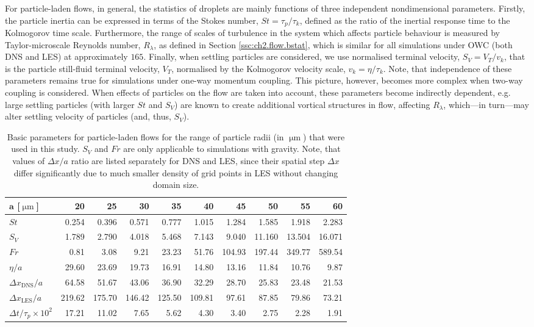 \documentclass{pracamgren}
\begin{document}
For particle-laden flows, in general, the statistics of droplets are mainly functions of three independent nondimensional parameters.
Firstly, the particle inertia can be expressed in terms of the Stokes number, $St = \tau_p / \tau_k$, defined as the ratio of the inertial response time to the
Kolmogorov time scale.
Furthermore, the range of scales of turbulence in the system which affects particle behaviour is measured by Taylor-microscale Reynolds number, $R_{\lambda}$, as defined in Section \ref{ssc:ch2.flow.bstat}, which is similar for all simulations under OWC (both DNS and LES) at approximately $165$.
Finally, when settling particles are considered, we use normalised terminal velocity, $S_V = V_T / v_k$, that is the particle still-fluid terminal velocity, $V_T$, normalised by the Kolmogorov velocity scale, $v_k = \eta / \tau_k$.
Note, that independence of these parameters remains true for simulations under one-way momentum coupling.
This picture, however, becomes more complex when two-way coupling is considered.
When effects of particles on the flow are taken into account, these parameters become indirectly dependent, e.g. large settling particles (with larger $St$ and $S_V$) are known to create additional vortical structures in flow, affecting $R_{\lambda}$, which---in turn---may alter settling velocity of particles (and, thus, $S_V$).

\begin{table}[ht]
\centering
\small
\begin{tabular}{lrrrrrrrrr}
$\mathbf{a}$ [$\upmu\text{m}$] & 20 & 25 & 30 & 35 & 40 & 45 & 50 & 55 & 60  \\ \hline
$St$ & 0.254 & 0.396 & 0.571 & 0.777 & 1.015 & 1.284 & 1.585 & 1.918 & 2.283 \\
$S_V$ & 1.789 & 2.790 & 4.018 & 5.468 & 7.143 & 9.040 & 11.160 & 13.504 & 16.071 \\
$Fr$ & 0.81 & 3.08 & 9.21 & 23.23 & 51.76 & 104.93 & 197.44 & 349.77 & 589.54 \\
$\eta / a$ & 29.60 & 23.69 & 19.73 & 16.91 & 14.80 & 13.16 & 11.84 & 10.76 & 9.87 \\
$\Delta x_{\text{DNS}} / a$ & 64.58 & 51.67 & 43.06 & 36.90 & 32.29 & 28.70 & 25.83 & 23.48 & 21.53 \\
$\Delta x_{\text{LES}} / a$ & 219.62 & 175.70 & 146.42 & 125.50 & 109.81 & 97.61 & 87.85 & 79.86 & 73.21 \\
$\Delta t / \tau_p \times 10^2$ & 17.21 & 11.02 & 7.65 & 5.62 & 4.30 & 3.40 & 2.75 & 2.28 & 1.91 \\ \hline
\end{tabular}
\caption{Basic parameters for particle-laden flows for the range of particle radii (in $\upmu\text{m}$) that were used in this study.
$S_V$ and $Fr$ are only applicable to simulations with gravity.
Note, that values of $\Delta x / a$ ratio are listed separately for DNS and LES, since their spatial step $\Delta x$ differ significantly due to much smaller density of grid points in LES without changing domain size. }
\label{tab:part-stats}
\end{table}
\end{document}
